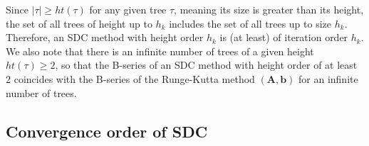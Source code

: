 \documentclass[sn-mathphys-num]{sn-jnl}%
\newcommand{\reva}[1]{#1}%
\theoremstyle{thmstyleone}%
\theoremstyle{thmstyletwo}%
\theoremstyle{thmstylethree}%
\begin{document}
Since $|\tau| \geq ht(\tau)$ for any given tree $\tau$, meaning its size is greater than its height, the set of all trees of height up to $h_k$ includes the set of all trees up to size $h_k$.
Therefore, an SDC method with height order $h_k$ is (at least) of \reva{iteration} order $h_k$. 
We also note that there is an infinite number of trees of a given height $ht(\tau) \geq 2$, so that the B-series of an SDC method with height order of at least $2$ coincides with the B-series of the Runge-Kutta method $(\bm{A}, \bm{b})$ for an infinite number of trees.

\subsection{Convergence order of SDC}
\label{sec:convergence_order_sdc}
\end{document}

